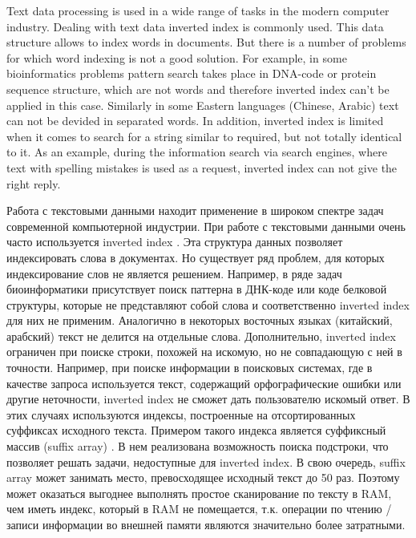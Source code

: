 

Text data processing is used in a wide range of tasks in the modern computer industry.
Dealing with text data inverted index \cite{zobel2006inverted} is commonly used. This data structure
allows to index words in documents. But there is a number of problems for which word indexing is not a good solution.
For example, in some bioinformatics problems \cite{tsuruoka2008facta} pattern search takes place in DNA-code or protein sequence structure,
which are not words and therefore inverted index can't be applied in this case.
Similarly in some Eastern languages (Chinese, Arabic) text can not be devided in separated words.
In addition, inverted index is limited when it comes to search for a string similar to required, but not totally identical to it.
As an example, during the information search via search engines, where text with spelling mistakes is used as a request, inverted index can not give the right reply.

Работа с текстовыми данными находит применение в широком спектре задач современной компьютерной индустрии.
При работе с текстовыми данными очень часто используется inverted index \cite{zobel2006inverted}. Эта структура данных
позволяет индексировать слова в документах. Но существует ряд проблем, для которых индексирование слов
не является решением.
Например, в ряде задач биоинформатики \cite{tsuruoka2008facta} присутствует поиск паттерна
в ДНК-коде или коде белковой структуры,
которые не представляют собой слова и соответственно inverted index для них не применим.
Аналогично в некоторых восточных языках (китайский, арабский) текст не делится на отдельные слова.
Дополнительно, inverted index ограничен при поиске строки, похожей на искомую, но не совпадающую с ней в точности.
Например, при поиске информации в поисковых системах, где в качестве запроса используется текст, содержащий
орфографические ошибки или другие неточности, inverted index не сможет дать пользователю искомый ответ.
В этих случаях используются индексы, построенные на отсортированных суффиксах исходного текста.
Примером такого индекса является суффиксный массив (suffix array) \cite{manber1993suffix}.
В нем реализована возможность поиска подстроки,
что позволяет решать задачи, недоступные для inverted index. В свою очередь, suffix array может занимать
место, превосходящее исходный текст до 50 раз.
Поэтому может оказаться выгоднее выполнять простое сканирование по тексту в RAM,
чем иметь индекс, который в RAM не помещается, т.к. операции по чтению / записи информации во внешней памяти
являются значительно более затратными.

